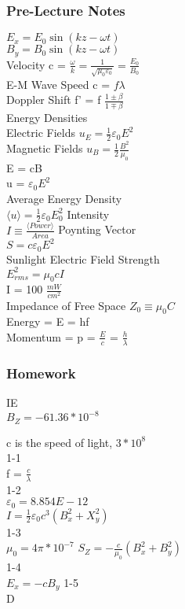 \documentclass{article}
\begin{document}
\subsubsection{Pre-Lecture Notes}
\noindent
$E_x = E_0 \sin(kz-\omega t)$ \\
$B_y = B_0 \sin(kz - \omega t)$ \\
Velocity c = $\frac{\omega}{k} = \frac{1}{\sqrt{\mu_0 \varepsilon_0}} = \frac{E_0}{B_0}$ \\
E-M Wave Speed c = $f \lambda$ \\
Doppler Shift f' = f $\frac{1 \pm \beta}{1 \mp \beta}$ \\
Energy Densities \\
Electric Fields $u_E = \frac{1}{2} \varepsilon_0 E^2$ \\
Magnetic Fields $u_B = \frac{1}{2} \frac{B^2}{\mu_0}$ \\ 
E = cB \\
u = $\varepsilon_0 E^2$ \\
Average Energy Density \\
$\langle u \rangle = \frac{1}{2}\varepsilon_0 E^2_0$
Intensity \\
$I \equiv \frac{\langle Power \rangle}{Area}$
Poynting Vector \\
$S = c \varepsilon_0 E^2$ \\
Sunlight Electric Field Strength \\
$E_{rms}^2 = \mu_0 c I$ \\
I = 100 $\frac{mW}{cm^2}$ \\
Impedance of Free Space $Z_0 \equiv \mu_0 C$ \\
Energy = E = hf \\
Momentum = p = $\frac{E}{c}$ = $\frac{h}{\lambda}$ 

\subsubsection{Homework}
\noindent
IE \\
$B_Z = -61.36*10^{-8}$

\vspace{2mm}

\noindent 
c is the speed of light, $3*10^8$ \\
1-1 \\
f = $\frac{c}{\lambda}$ \\
1-2 \\
$\varepsilon_0 = 8.854E-12$ \\
$I = \frac{1}{2} \varepsilon_0 c^3 (B_x^2+X_y^2)$ \\
1-3 \\
$\mu_0 = 4 \pi * 10^{-7}$
$S_Z = -\frac{c}{\mu_0}(B_x^2 + B_y^2)$ \\
1-4 \\
$E_x = -cB_y$
1-5 \\
D
\end{document}
